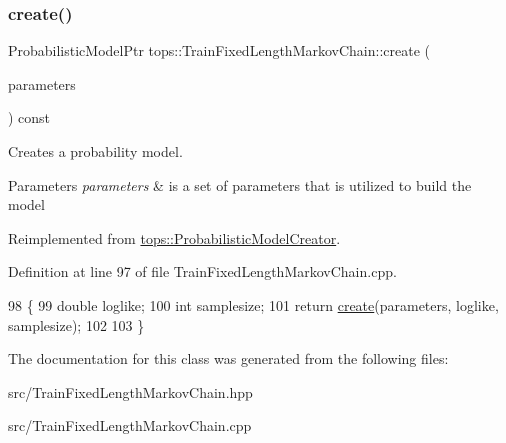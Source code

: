 \subsubsection{\texorpdfstring{create()}{create()}}
{\footnotesize\ttfamily Probabilistic\+Model\+Ptr tops\+::\+Train\+Fixed\+Length\+Markov\+Chain\+::create (\begin{DoxyParamCaption}\item[{\hyperlink{classtops_1_1ProbabilisticModelParameters}{Probabilistic\+Model\+Parameters} \&}]{parameters }\end{DoxyParamCaption}) const\hspace{0.3cm}{\ttfamily [virtual]}}



Creates a probability model. 


\begin{DoxyParams}{Parameters}
{\em parameters} & is a set of parameters that is utilized to build the model \\
\hline
\end{DoxyParams}


Reimplemented from \hyperlink{classtops_1_1ProbabilisticModelCreator_afed6c8ffa45fff446bdaa8b533da8f7c}{tops\+::\+Probabilistic\+Model\+Creator}.



Definition at line 97 of file Train\+Fixed\+Length\+Markov\+Chain.\+cpp.


\begin{DoxyCode}
98                                                                  \{
99         \textcolor{keywordtype}{double} loglike;
100         \textcolor{keywordtype}{int} samplesize;
101         \textcolor{keywordflow}{return} \hyperlink{classtops_1_1TrainFixedLengthMarkovChain_a13c61bbbe042026a4e406f5ba9214b0e}{create}(parameters, loglike, samplesize);
102 
103 \}
\end{DoxyCode}


The documentation for this class was generated from the following files\+:\begin{DoxyCompactItemize}
\item 
src/Train\+Fixed\+Length\+Markov\+Chain.\+hpp\item 
src/Train\+Fixed\+Length\+Markov\+Chain.\+cpp\end{DoxyCompactItemize}
